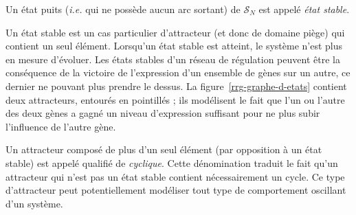 \begin{definition}
Un état puits (\textit{i.e.} qui ne possède aucun arc sortant) de $\mathcal{S}_N$ est appelé \emph{état stable}.
\end{definition}

Un état stable est un cas particulier d'attracteur (et donc de domaine piège) qui contient un seul élément. Lorsqu'un état stable est atteint, le système n'est plus en mesure d'évoluer. Les états stables d'un réseau de régulation peuvent être la conséquence de la \og victoire \fg{} de l'expression d'un ensemble de gènes sur un autre, ce dernier ne pouvant plus prendre le dessus. La figure~\ref{rrg-graphe-d-etats} contient deux attracteurs, entourés en pointillés ; ils modélisent le fait que l'un ou l'autre des deux gènes a gagné un niveau d'expression suffisant pour ne plus subir l'influence de l'autre gène.

Un attracteur composé de plus d'un seul élément (par opposition à un état stable) est appelé qualifié de \emph{cyclique}. Cette dénomination traduit le fait qu'un attracteur qui n'est pas un état stable contient nécessairement un cycle. Ce type d'attracteur peut potentiellement modéliser tout type de comportement oscillant d'un système.
